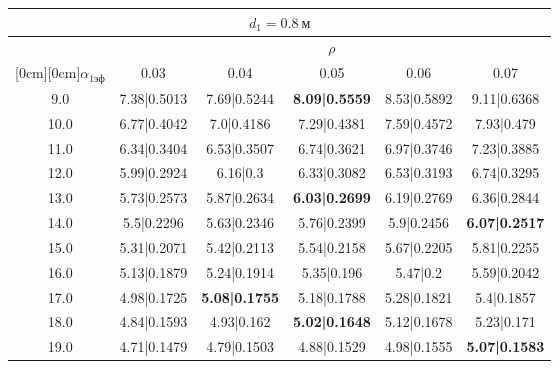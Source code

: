 \documentclass[20pt]{article}
\begin{document}
\begin{center}
\begin{tabular}{c|ccccc}
\hline
	\multicolumn{6}{c}{$d_{1}=0.8 \ м$} \\
\hline
	 & \multicolumn{5}{|c}{$\rho$} \\
	\cline{2-6}
	\raisebox{1.5ex}[0cm][0cm]{$\alpha_{1эф}$} & 0.03 & 0.04 & 0.05 & 0.06 & 0.07\\
\hline
	9.0 & 	7.38|0.5013 & 	7.69|0.5244 & 	\textbf{8.09|0.5559} & 	8.53|0.5892 & 	9.11|0.6368\\
	10.0 & 	6.77|0.4042 & 	7.0|0.4186 & 	7.29|0.4381 & 	7.59|0.4572 & 	7.93|0.479\\
	11.0 & 	6.34|0.3404 & 	6.53|0.3507 & 	6.74|0.3621 & 	6.97|0.3746 & 	7.23|0.3885\\
	12.0 & 	5.99|0.2924 & 	6.16|0.3 & 	6.33|0.3082 & 	6.53|0.3193 & 	6.74|0.3295\\
	13.0 & 	5.73|0.2573 & 	5.87|0.2634 & 	\textbf{6.03|0.2699} & 	6.19|0.2769 & 	6.36|0.2844\\
	14.0 & 	5.5|0.2296 & 	5.63|0.2346 & 	5.76|0.2399 & 	5.9|0.2456 & 	\textbf{6.07|0.2517}\\
	15.0 & 	5.31|0.2071 & 	5.42|0.2113 & 	5.54|0.2158 & 	5.67|0.2205 & 	5.81|0.2255\\
	16.0 & 	5.13|0.1879 & 	5.24|0.1914 & 	5.35|0.196 & 	5.47|0.2 & 	5.59|0.2042\\
	17.0 & 	4.98|0.1725 & 	\textbf{5.08|0.1755} & 	5.18|0.1788 & 	5.28|0.1821 & 	5.4|0.1857\\
	18.0 & 	4.84|0.1593 & 	4.93|0.162 & 	\textbf{5.02|0.1648} & 	5.12|0.1678 & 	5.23|0.171\\
	19.0 & 	4.71|0.1479 & 	4.79|0.1503 & 	4.88|0.1529 & 	4.98|0.1555 & 	\textbf{5.07|0.1583}\\
\end{tabular}


\end{center}
\end{document}
